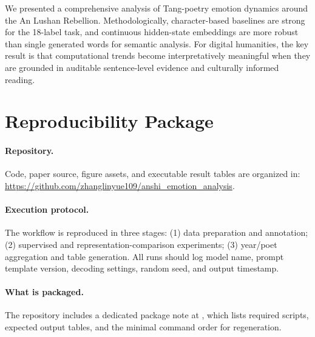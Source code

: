 \documentclass[11pt]{article}
\begin{document}
We presented a comprehensive analysis of Tang-poetry emotion dynamics around the An Lushan Rebellion.
Methodologically, character-based baselines are strong for the 18-label task, and continuous hidden-state embeddings are more robust than single generated words for semantic analysis.
For digital humanities, the key result is that computational trends become interpretatively meaningful when they are grounded in auditable sentence-level evidence and culturally informed reading.

\appendix
\section{Reproducibility Package}
\label{app:repro}

\paragraph{Repository.}
Code, paper source, figure assets, and executable result tables are organized in:
\url{https://github.com/zhanglinyue109/anshi_emotion_analysis}.

\paragraph{Execution protocol.}
The workflow is reproduced in three stages:
(1) data preparation and annotation;
(2) supervised and representation-comparison experiments;
(3) year/poet aggregation and table generation.
All runs should log model name, prompt template version, decoding settings, random seed, and output timestamp.

\paragraph{What is packaged.}
The repository includes a dedicated package note at
,
which lists required scripts, expected output tables, and the minimal command order for regeneration.


\end{document}
